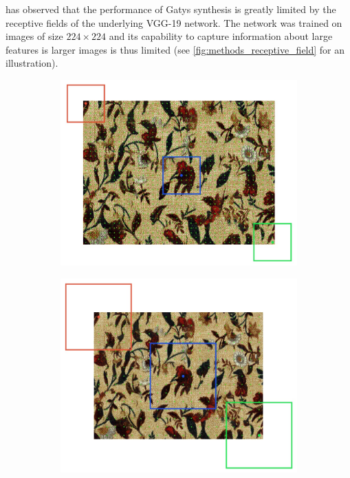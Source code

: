 \citet{Snelgrove2017} has observed that the performance of Gatys synthesis is greatly limited by the receptive fields of the underlying VGG-19 network. The network was trained on images of size \(224 \times 224\) and its capability to capture information about large features is larger images is thus limited (see \ref{fig:methods_receptive_field} for an illustration).

\begin{figure}[]
    \centering
    \begin{subfigure}[b]{0.48\textwidth}
        \centering
        \includegraphics[width=\textwidth]{images/03-receptive_field-level0.jpg}
        \caption{}
        \label{fig:methods_receptive_field_lvl0}
    \end{subfigure}
    \hfill
    \begin{subfigure}[b]{0.48\textwidth}
        \centering
        \includegraphics[width=\textwidth]{images/03-receptive_field-level1.jpg}

\end{subfigure}
\end{figure}
